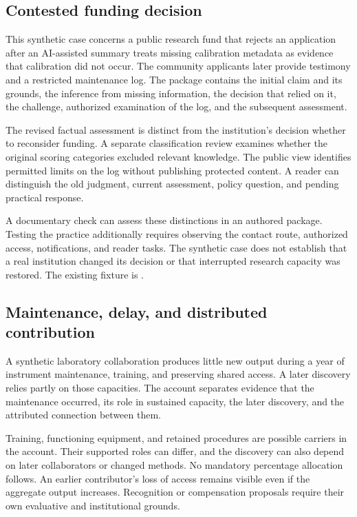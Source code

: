 \documentclass[11pt,a4paper]{article}
\begin{document}
\subsection{Contested funding decision}
This synthetic case concerns a public research fund that rejects an application after an AI-assisted summary treats missing calibration metadata as evidence that calibration did not occur. The community applicants later provide testimony and a restricted maintenance log. The package contains the initial claim and its grounds, the inference from missing information, the decision that relied on it, the challenge, authorized examination of the log, and the subsequent assessment.

The revised factual assessment is distinct from the institution's decision whether to reconsider funding. A separate classification review examines whether the original scoring categories excluded relevant knowledge. The public view identifies permitted limits on the log without publishing protected content. A reader can distinguish the old judgment, current assessment, policy question, and pending practical response.

A documentary check can assess these distinctions in an authored package. Testing the practice additionally requires observing the contact route, authorized access, notifications, and reader tasks. The synthetic case does not establish that a real institution changed its decision or that interrupted research capacity was restored. The existing fixture is .

\subsection{Maintenance, delay, and distributed contribution}
A synthetic laboratory collaboration produces little new output during a year of instrument maintenance, training, and preserving shared access. A later discovery relies partly on those capacities. The account separates evidence that the maintenance occurred, its role in sustained capacity, the later discovery, and the attributed connection between them.

Training, functioning equipment, and retained procedures are possible carriers in the account. Their supported roles can differ, and the discovery can also depend on later collaborators or changed methods. No mandatory percentage allocation follows. An earlier contributor's loss of access remains visible even if the aggregate output increases. Recognition or compensation proposals require their own evaluative and institutional grounds.
\end{document}
